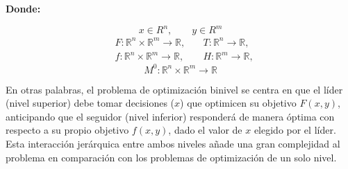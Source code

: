  \newpage
 \begin{samepage}
\textbf{Donde:}

\begin{equation*}  
x \in R^{n}, \quad \quad y \in R^{m}
\end{equation*}
\begin{align*}
   & F : \mathbb{R}^{n} \times \mathbb{R}^{m} \to \mathbb{R}, 
   & \quad  T :\mathbb{R}^{n} \to \mathbb{R},
   \\
    & f : \mathbb{R}^{n} \times \mathbb{R}^{m} \to \mathbb{R} ,
    & \quad H : \mathbb{R}^{m} \to \mathbb{R}, 
\end{align*}
\begin{equation*}
M^0: \mathbb{R}^{n} \times \mathbb{R}^{m} \to \mathbb{R}
\end{equation*}
\end{samepage}
En otras palabras, el problema de optimización binivel se centra en que el líder (nivel superior) debe tomar decisiones ($x$) que optimicen su objetivo $F(x, y)$, anticipando que el seguidor (nivel inferior) responderá de manera óptima con respecto a su propio objetivo $f(x, y)$, dado el valor de $x$ elegido por el líder. Esta interacción jerárquica entre ambos niveles añade una gran complejidad al problema en comparación con los problemas de optimización de un solo nivel.

